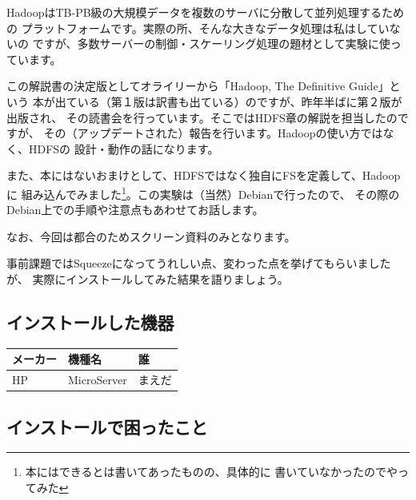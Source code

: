 \documentclass[mingoth,a4paper]{jsarticle}
\begin{document}

HadoopはTB-PB級の大規模データを複数のサーバに分散して並列処理するための
プラットフォームです。実際の所、そんな大きなデータ処理は私はしていないの
ですが、多数サーバーの制御・スケーリング処理の題材として実験に使っています。

この解説書の決定版としてオライリーから「Hadoop, The Definitive Guide」という
本が出ている（第１版は訳書も出ている）のですが、昨年半ばに第２版が出版され、
その読書会を行っています。そこではHDFS章の解説を担当したのですが、
その（アップデートされた）報告を行います。Hadoopの使い方ではなく、HDFSの
設計・動作の話になります。

また、本にはないおまけとして、HDFSではなく独自にFSを定義して、Hadoopに
組み込んでみました\footnote{本にはできるとは書いてあったものの、具体的に
書いていなかったのでやってみた}。この実験は（当然）Debianで行ったので、
その際のDebian上での手順や注意点もあわせてお話します。

なお、今回は都合のためスクリーン資料のみとなります。


事前課題ではSqueezeになってうれしい点、変わった点を挙げてもらいましたが、
実際にインストールしてみた結果を語りましょう。

\subsection{インストールした機器}

\begin{table}[ht]
 \begin{center}
  \begin{tabular}{|p{10em}|p{15em}|p{15em}|}
   \hline
   メーカー & 機種名 & 誰 \\
   \hline
   HP & MicroServer & まえだ\\
   \hline
  \end{tabular}
 \end{center}
\end{table}

\subsection{インストールで困ったこと}
\end{document}
